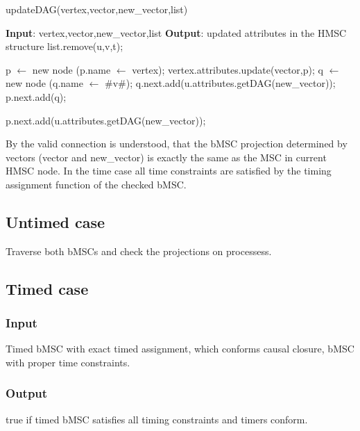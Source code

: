 \documentclass{article}
\begin{document}
\begin{algorithm}
\caption{updateDAG(vertex,vector,new\_vector,list)}
\begin{algorithmic}[1]
\STATE \textbf{Input}: vertex,vector,new\_vector,list
\STATE \textbf{Output}: updated attributes in the HMSC structure
\STATE 
{}
\STATE list.remove(u,v,t);
\ENDFOR
{}

 \STATE *p $\leftarrow$ new node (p.name $\leftarrow$ vertex);
 \STATE vertex.attributes.update(vector,p);
 \STATE {}
 \STATE *q $\leftarrow$ new node (q.name $\leftarrow$ \#v\#);
 \STATE q.next.add(u.attributes.getDAG(new\_vector));
 \STATE p.next.add(q);
 \ENDIF

 \STATE p.next.add(u.attributes.getDAG(new\_vector));
 \ENDIF
 \ENDFOR

\ENDIF

\end{algorithmic}
\end{algorithm}


By the valid connection is understood, that  the bMSC projection determined by vectors (vector and new\_vector) is exactly the same as the MSC in current HMSC node. In the time case all time constraints are satisfied by the timing assignment function of the checked bMSC.

\subsection*{Untimed case}
Traverse both bMSCs and check the projections on processess.

\subsection*{Timed case}
\subsubsection*{Input}
Timed bMSC with exact timed assignment, which conforms causal closure, bMSC with proper time constraints.
\subsubsection*{Output}
true if timed bMSC satisfies all timing constraints and timers conform.
\end{document}
